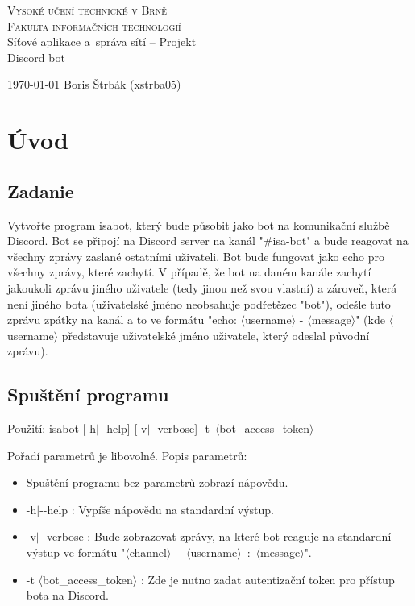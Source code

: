 \documentclass[a4paper,11pt]{article}
\begin{document}
\begin{titlepage}
	\begin{center}
		\textsc{
		{\Huge Vysoké učení technické v Brně}\\{\huge Fakulta informačních technologií}
		}
		{\LARGE \\ Síťové aplikace a~správa sítí -- Projekt \\[6pt] {\Huge Discord bot}}
	\end{center}

	{\Large
	\today
	\hfill
	Boris Štrbák (xstrba05)
	}
\end{titlepage}

\tableofcontents
\newpage

\section{Úvod}
\subsection{Zadanie}
Vytvořte program isabot, který bude působit jako bot na komunikační službě Discord. Bot se připojí na Discord server na kanál "\#isa-bot" a bude reagovat na všechny zprávy zaslané ostatními uživateli. Bot bude fungovat jako echo pro všechny zprávy, které zachytí. V případě, že bot na daném kanále zachytí jakoukoli zprávu jiného uživatele (tedy jinou než svou vlastní) a zároveň, která není jiného bota (uživatelské jméno neobsahuje podřetězec "bot"), odešle tuto zprávu zpátky na kanál a to ve formátu "echo: $\langle$username$\rangle$ - $\langle$message$\rangle$" (kde $\langle$username$\rangle$ představuje uživatelské jméno uživatele, který odeslal původní zprávu).

\subsection{Spuštění programu}
Použití: isabot [-h$|$-{}-help] [-v$|$-{}-verbose] -t\ $\langle$bot\_access\_token$\rangle$

Pořadí parametrů je libovolné. Popis parametrů:

\begin{itemize}
	\item Spuštění programu bez parametrů zobrazí nápovědu.
	\item {-h$|$-{}-help : Vypíše nápovědu na standardní výstup.}
	\item {-v$|$-{}-verbose : Bude zobrazovat zprávy, na které bot reaguje na standardní výstup ve formátu "$\langle$channel$\rangle$~-~$\langle$username$\rangle$~:~$\langle$message$\rangle$".}
	\item -t $\langle$bot\_access\_token$\rangle$ : Zde je nutno zadat autentizační token pro přístup bota na Discord.
\end{itemize}
\end{document}
